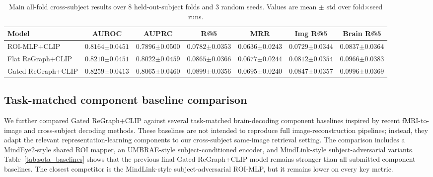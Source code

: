 \documentclass{article}
\begin{document}
\begin{table}[!htbp]
  \centering
  \caption{Main all-fold cross-subject results over 8 held-out-subject folds and 3 random seeds. Values are mean $\pm$ std over fold$\times$seed runs.}
  \label{tab:cross_subject_main}
  \scriptsize
  \setlength{\tabcolsep}{3.5pt}
  \renewcommand{\arraystretch}{1.15}
  \begin{tabular}{lcccccc}
    \toprule
    Model & AUROC & AUPRC & R@5 & MRR & Img R@5 & Brain R@5 \\
    \midrule
    ROI-MLP+CLIP
    & $0.8164{\scriptstyle\pm0.0451}$
    & $0.7896{\scriptstyle\pm0.0500}$
    & $0.0782{\scriptstyle\pm0.0353}$
    & $0.0636{\scriptstyle\pm0.0243}$
    & $0.0729{\scriptstyle\pm0.0344}$
    & $0.0837{\scriptstyle\pm0.0364}$ \\
    Flat ReGraph+CLIP
    & $0.8210{\scriptstyle\pm0.0451}$
    & $0.8022{\scriptstyle\pm0.0459}$
    & $0.0865{\scriptstyle\pm0.0366}$
    & $0.0677{\scriptstyle\pm0.0244}$
    & $0.0812{\scriptstyle\pm0.0354}$
    & $0.0966{\scriptstyle\pm0.0383}$ \\
    Gated ReGraph+CLIP
    & $\mathbf{0.8259}{\scriptstyle\pm0.0413}$
    & $\mathbf{0.8065}{\scriptstyle\pm0.0460}$
    & $\mathbf{0.0899}{\scriptstyle\pm0.0356}$
    & $\mathbf{0.0695}{\scriptstyle\pm0.0240}$
    & $\mathbf{0.0847}{\scriptstyle\pm0.0357}$
    & $\mathbf{0.0996}{\scriptstyle\pm0.0369}$ \\
    \bottomrule
  \end{tabular}
\end{table}

\subsection{Task-matched component baseline comparison}

We further compared Gated ReGraph+CLIP against several task-matched brain-decoding component baselines inspired by recent fMRI-to-image and cross-subject decoding methods. These baselines are not intended to reproduce full image-reconstruction pipelines; instead, they adapt the relevant representation-learning components to our cross-subject same-image retrieval setting. The comparison includes a MindEye2-style shared ROI mapper, an UMBRAE-style subject-conditioned encoder, and MindLink-style subject-adversarial variants. Table~\ref{tab:sota_baselines} shows that the previous final Gated ReGraph+CLIP model remains stronger than all submitted component baselines. The closest competitor is the MindLink-style subject-adversarial ROI-MLP, but it remains lower on every key metric.
\end{document}
